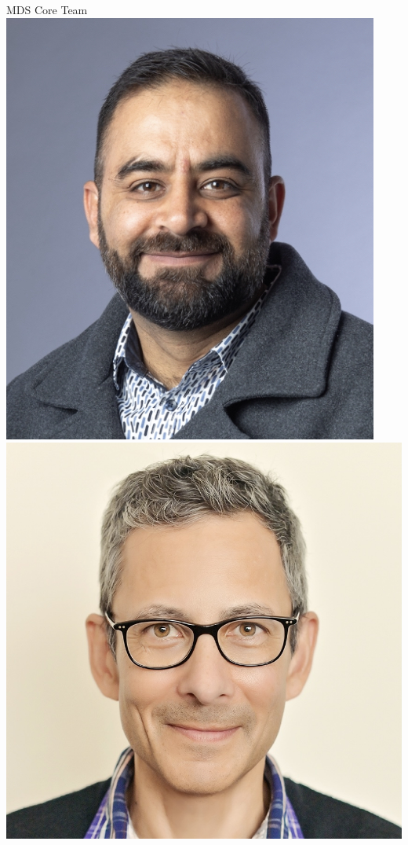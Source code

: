 \documentclass[
  ignorenonframetext,
  aspectratio=169,
]{beamer}
\begin{document}
\begin{frame}{MDS Core Team}
\label{mds-core-team}
\includegraphics{figs/usman-a.jpeg} \includegraphics{figs/joe-b.jpg}

\end{frame}
\end{document}
